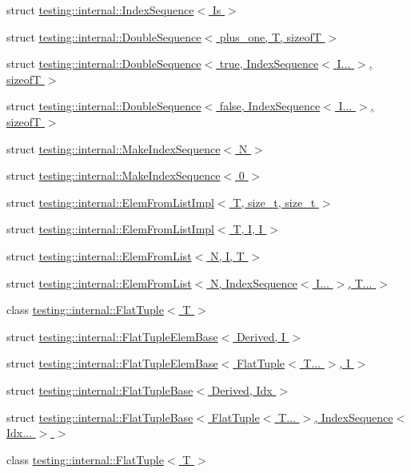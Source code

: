 \begin{DoxyCompactItemize}
\item 
struct \hyperlink{structtesting_1_1internal_1_1IndexSequence}{testing\+::internal\+::\+Index\+Sequence$<$ Is $>$}
\item 
struct \hyperlink{structtesting_1_1internal_1_1DoubleSequence}{testing\+::internal\+::\+Double\+Sequence$<$ plus\+\_\+one, T, sizeof\+T $>$}
\item 
struct \hyperlink{structtesting_1_1internal_1_1DoubleSequence_3_01true_00_01IndexSequence_3_01I_8_8_8_01_4_00_01sizeofT_01_4}{testing\+::internal\+::\+Double\+Sequence$<$ true, Index\+Sequence$<$ I... $>$, sizeof\+T $>$}
\item 
struct \hyperlink{structtesting_1_1internal_1_1DoubleSequence_3_01false_00_01IndexSequence_3_01I_8_8_8_01_4_00_01sizeofT_01_4}{testing\+::internal\+::\+Double\+Sequence$<$ false, Index\+Sequence$<$ I... $>$, sizeof\+T $>$}
\item 
struct \hyperlink{structtesting_1_1internal_1_1MakeIndexSequence}{testing\+::internal\+::\+Make\+Index\+Sequence$<$ N $>$}
\item 
struct \hyperlink{structtesting_1_1internal_1_1MakeIndexSequence_3_010_01_4}{testing\+::internal\+::\+Make\+Index\+Sequence$<$ 0 $>$}
\item 
struct \hyperlink{structtesting_1_1internal_1_1ElemFromListImpl}{testing\+::internal\+::\+Elem\+From\+List\+Impl$<$ T, size\+\_\+t, size\+\_\+t $>$}
\item 
struct \hyperlink{structtesting_1_1internal_1_1ElemFromListImpl_3_01T_00_01I_00_01I_01_4}{testing\+::internal\+::\+Elem\+From\+List\+Impl$<$ T, I, I $>$}
\item 
struct \hyperlink{structtesting_1_1internal_1_1ElemFromList}{testing\+::internal\+::\+Elem\+From\+List$<$ N, I, T $>$}
\item 
struct \hyperlink{structtesting_1_1internal_1_1ElemFromList_3_01N_00_01IndexSequence_3_01I_8_8_8_01_4_00_01T_8_8_8_01_4}{testing\+::internal\+::\+Elem\+From\+List$<$ N, Index\+Sequence$<$ I... $>$, T... $>$}
\item 
class \hyperlink{classtesting_1_1internal_1_1FlatTuple}{testing\+::internal\+::\+Flat\+Tuple$<$ T $>$}
\item 
struct \hyperlink{structtesting_1_1internal_1_1FlatTupleElemBase}{testing\+::internal\+::\+Flat\+Tuple\+Elem\+Base$<$ Derived, I $>$}
\item 
struct \hyperlink{structtesting_1_1internal_1_1FlatTupleElemBase_3_01FlatTuple_3_01T_8_8_8_01_4_00_01I_01_4}{testing\+::internal\+::\+Flat\+Tuple\+Elem\+Base$<$ Flat\+Tuple$<$ T... $>$, I $>$}
\item 
struct \hyperlink{structtesting_1_1internal_1_1FlatTupleBase}{testing\+::internal\+::\+Flat\+Tuple\+Base$<$ Derived, Idx $>$}
\item 
struct \hyperlink{structtesting_1_1internal_1_1FlatTupleBase_3_01FlatTuple_3_01T_8_8_8_01_4_00_01IndexSequence_3_01Idx_8_8_8_01_4_01_4}{testing\+::internal\+::\+Flat\+Tuple\+Base$<$ Flat\+Tuple$<$ T... $>$, Index\+Sequence$<$ Idx... $>$ $>$}
\item 
class \hyperlink{classtesting_1_1internal_1_1FlatTuple}{testing\+::internal\+::\+Flat\+Tuple$<$ T $>$}
\end{DoxyCompactItemize}
